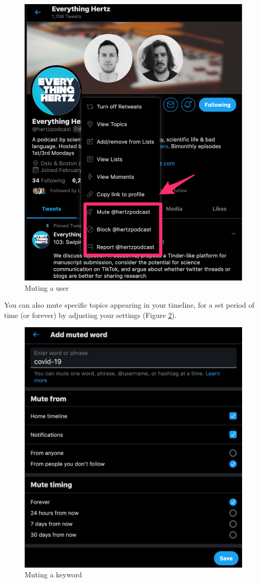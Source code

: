 \documentclass[]{book}
\begin{document}
\begin{figure}

{\centering \includegraphics[width=0.8\linewidth]{images/mute} 

}

\caption{Muting a user}\label{fig:mute}
\end{figure}

You can also mute specific topics appearing in your timeline, for a set period of time (or forever) by adjusting your settings (Figure \ref{fig:mute-word}).

\begin{figure}

{\centering \includegraphics[width=0.8\linewidth]{images/mute_word} 

}

\caption{Muting a keyword}\label{fig:mute-word}
\end{figure}
\end{document}
